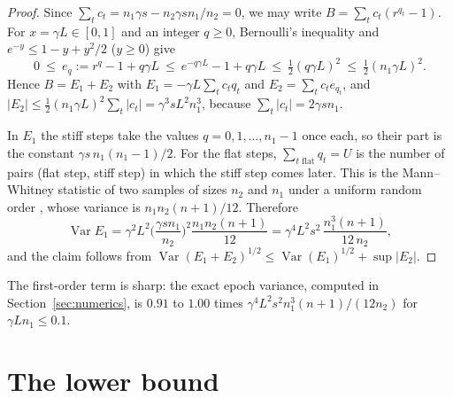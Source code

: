 \documentclass[11pt]{amsart}
\theoremstyle{remark}\newtheorem{remark}[theorem]{Remark}
\newcommand{\Var}{\operatorname{Var}}
\begin{document}
\begin{proof}
Since $\sum_tc_t=n_1\gamma s-n_2\gamma sn_1/n_2=0$, we may write $B=\sum_tc_t(r^{q_t}-1)$. For $x=\gamma L\in[0,1]$ and
an integer $q\ge0$, Bernoulli's inequality and $e^{-y}\le1-y+y^2/2$ ($y\ge0$) give
\[
0\ \le\ e_q:=r^q-1+q\gamma L\ \le\ e^{-q\gamma L}-1+q\gamma L\ \le\ \tfrac12(q\gamma L)^2\ \le\ \tfrac12(n_1\gamma L)^2 .
\]
Hence $B=E_1+E_2$ with $E_1=-\gamma L\sum_tc_tq_t$ and $E_2=\sum_tc_te_{q_t}$, and
$|E_2|\le\frac12(n_1\gamma L)^2\sum_t|c_t|=\gamma^3sL^2n_1^3$, because $\sum_t|c_t|=2\gamma sn_1$.

In $E_1$ the stiff steps take the values $q=0,1,\dots,n_1-1$ once each, so their part is the constant
$\gamma s\,n_1(n_1-1)/2$. For the flat steps, $\sum_{t\text{ flat}}q_t=U$ is the number of pairs (flat step, stiff
step) in which the stiff step comes later. This is the Mann--Whitney statistic of two samples of sizes $n_2$ and $n_1$
under a uniform random order \cite{mw}, whose variance is $n_1n_2(n+1)/12$. Therefore
\[
\Var E_1=\gamma^2L^2\Big(\frac{\gamma sn_1}{n_2}\Big)^2\frac{n_1n_2(n+1)}{12}=\gamma^4L^2s^2\,\frac{n_1^3(n+1)}{12\,n_2},
\]
and the claim follows from $\Var(E_1+E_2)^{1/2}\le\Var(E_1)^{1/2}+\sup|E_2|$.
\end{proof}

The first-order term is sharp: the exact epoch variance, computed in Section~\ref{sec:numerics}, is $0.91$ to $1.00$
times $\gamma^4L^2s^2n_1^3(n+1)/(12n_2)$ for $\gamma Ln_1\le0.1$.

\section{The lower bound}\label{sec:lower}
\end{document}
